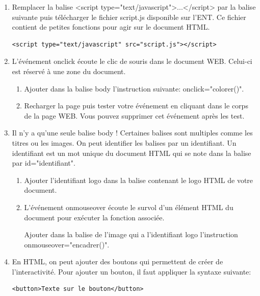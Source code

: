 \documentclass[12pt,a4paper]{article}
\begin{document}
\begin{enumerate}
\item Remplacer la balise \textsf{<script type="text/javascript">...</script>} par la balise suivante puis télécharger le fichier \textsf{script.js} disponible sur l'ENT. Ce fichier contient de petites fonctions pour agir sur le document HTML.

\begin{lstlisting}
<script type="text/javascript" src="script.js"></script>
\end{lstlisting}


\item L'événement \textsf{onclick} écoute le clic de souris dans le document WEB. Celui-ci est réservé à une zone du document.

\begin{enumerate}
\item Ajouter dans la balise \textsf{body} l'instruction suivante: \textsf{onclick="colorer()"}.

\item Recharger la page puis tester votre événement en cliquant dans le corps de la page WEB. Vous pouvez supprimer cet événement après les test.
\end{enumerate}

\item Il n'y a qu'une seule balise body ! Certaines balises sont multiples comme les titres ou les images. On peut identifier les balises par un identifiant. Un identifiant est un mot unique du document HTML qui se note dans la balise par \textsf{id="identifiant"}.

\begin{enumerate}
\item Ajouter l'identifiant \textsf{logo} dans la balise contenant le logo HTML de votre document.
\item L'événement \textsf{onmouseover} écoute le survol d'un élément HTML du document pour exécuter la fonction associée. 

Ajouter dans la balise de l'image qui a l'identifiant \textsf{logo} l'instruction \textsf{onmouseover="encadrer()"}.
\end{enumerate}

\item En HTML, on peut ajouter des boutons qui permettent de créer de l'interactivité. Pour ajouter un bouton, il faut appliquer la syntaxe suivante:

\begin{lstlisting}
<button>Texte sur le bouton</button>
\end{lstlisting}


\end{enumerate}
\end{document}
